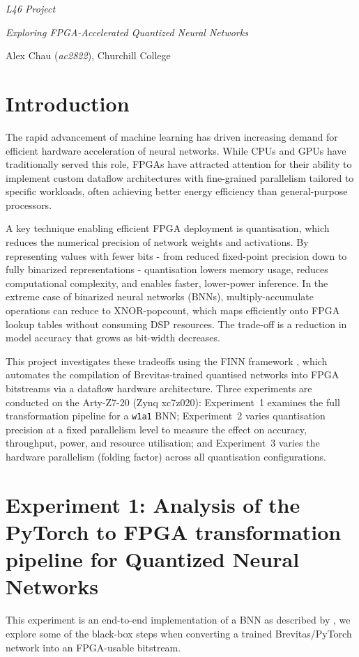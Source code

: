\documentclass[11pt]{article}
\begin{document}
\vspace{-2em}
\centerline{\large \emph{L46 Project}}
\vspace{2em}
\centerline{\Large \emph{Exploring FPGA-Accelerated Quantized Neural Networks}}
\vspace{2em}
\centerline{\large Alex Chau (\emph{ac2822}), Churchill College}
\section{Introduction}
The rapid advancement of machine learning has driven increasing demand for efficient hardware acceleration of neural networks.
While CPUs and GPUs have traditionally served this role, FPGAs have attracted attention for their ability to implement custom dataflow architectures with fine-grained parallelism tailored to specific workloads, often achieving better energy efficiency than general-purpose processors.

A key technique enabling efficient FPGA deployment is quantisation, which reduces the numerical precision of network weights and activations.
By representing values with fewer bits - from reduced fixed-point precision down to fully binarized representations - quantisation lowers memory usage, reduces computational complexity, and enables faster, lower-power inference.
In the extreme case of binarized neural networks (BNNs), multiply-accumulate operations can reduce to XNOR-popcount, which maps efficiently onto FPGA lookup tables without consuming DSP resources.
The trade-off is a reduction in model accuracy that grows as bit-width decreases.

This project investigates these tradeoffs using the FINN framework \cite{umurogluFINNFrameworkFast2017}, which automates the compilation of Brevitas-trained quantised networks into FPGA bitstreams via a dataflow hardware architecture.
Three experiments are conducted on the Arty-Z7-20 (Zynq xc7z020): Experiment~1 examines the full transformation pipeline for a \texttt{w1a1} BNN; Experiment~2 varies quantisation precision at a fixed parallelism level to measure the effect on accuracy, throughput, power, and resource utilisation; and Experiment~3 varies the hardware parallelism (folding factor) across all quantisation configurations.
\section{Experiment 1: Analysis of the PyTorch to FPGA transformation pipeline for Quantized Neural Networks}
This experiment is an end-to-end implementation of a BNN as described by \cite{courbariauxBinarizedNeuralNetworks2016a}, we explore some of the black-box steps when converting a trained Brevitas/PyTorch network into an FPGA-usable bitstream.
\end{document}
